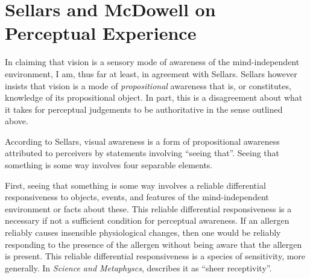 \documentclass[12pt]{article}
\begin{document}

\section{Sellars and McDowell on Perceptual Experience} %
\label{sec:mcdowell_on_sellars_on_perception}

In claiming that vision is a sensory mode of awareness of the mind-independent environment, I am, thus far at least, in agreement with Sellars. Sellars however insists that vision is a mode of \emph{propositional} awareness that is, or constitutes, knowledge of its propositional object. In part, this is a disagreement about what it takes for perceptual judgements to be authoritative in the sense outlined above. %

According to Sellars, visual awareness is a form of propositional awareness attributed to perceivers by statements involving ``seeing that''. Seeing that something is some way involves four separable elements.

First, seeing that something is some way involves a reliable differential responsiveness to objects, events, and features of the mind-independent environment or facts about these. This reliable differential responsiveness is a necessary if not a sufficient condition for perceptual awareness. If an allergen reliably causes insensible physiological changes, then one would be reliably responding to the presence of the allergen without being aware that the allergen is present. This reliable differential responsiveness is a species of sensitivity, more generally. In \emph{Science and Metaphyscs}, \citet[4]{Sellars:1967uq} describes it as ``sheer receptivity''.
\end{document}
